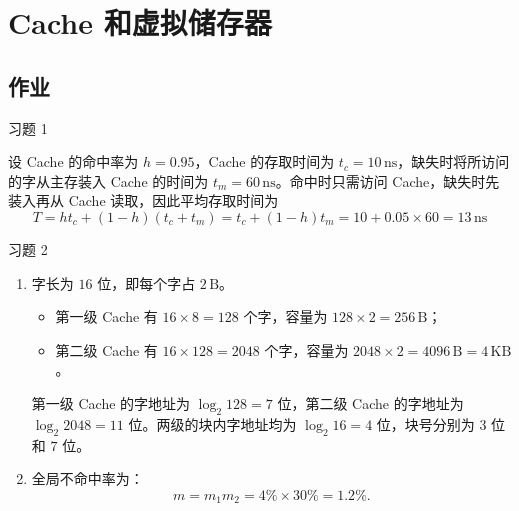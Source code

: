\section{Cache 和虚拟储存器}

\subsection{作业}

\begin{problem}
    习题 1
    \begin{solution}
        设 Cache 的命中率为 $h=0.95$，Cache 的存取时间为 $t_c=10\,\mathrm{ns}$，缺失时将所访问的字从主存装入 Cache 的时间为 $t_m=60\,\mathrm{ns}$。命中时只需访问 Cache，缺失时先装入再从 Cache 读取，因此平均存取时间为
        $$
        T = h t_c + (1-h)(t_c + t_m) = t_c + (1-h)t_m = 10 + 0.05 \times 60 = 13\,\mathrm{ns}
        $$
    \end{solution}
\end{problem}

\begin{problem}
    习题 2
    \begin{solution}
        \begin{enumerate}
            \item[\textbf{1)}] 字长为 $16$ 位，即每个字占 $2\,\mathrm{B}$。
            \begin{itemize}
                \item 第一级 Cache 有 $16 \times 8 = 128$ 个字，容量为 $128 \times 2 = 256\,\mathrm{B}$；
                \item 第二级 Cache 有 $16 \times 128 = 2048$ 个字，容量为 $2048 \times 2 = 4096\,\mathrm{B} = 4\,\mathrm{KB}$。
            \end{itemize}
            第一级 Cache 的字地址为 $\log_2 128 = 7$ 位，第二级 Cache 的字地址为 $\log_2 2048 = 11$ 位。两级的块内字地址均为 $\log_2 16 = 4$ 位，块号分别为 $3$ 位和 $7$ 位。

            \item[\textbf{2)}] 全局不命中率为：
            $$
            m = m_1 m_2 = 4\% \times 30\% = 1.2\%.
            $$
        \end{enumerate}
    \end{solution}
\end{problem}

